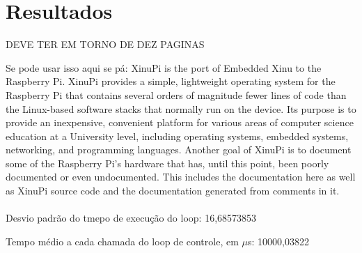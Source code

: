 \section{Resultados}
\label{seq:resultados}

DEVE TER EM TORNO DE DEZ PAGINAS


Se pode usar isso aqui se pá: XinuPi is the port of Embedded Xinu to the Raspberry Pi. XinuPi provides a simple, lightweight operating system for the Raspberry Pi that contains several orders of magnitude fewer lines of code than the Linux-based software stacks that normally run on the device. Its purpose is to provide an inexpensive, convenient platform for various areas of computer science education at a University level, including operating systems, embedded systems, networking, and programming languages. Another goal of XinuPi is to document some of the Raspberry Pi’s hardware that has, until this point, been poorly documented or even undocumented. This includes the documentation here as well as XinuPi source code and the documentation generated from comments in it.
\\\\
Desvio padrão do tmepo de execução do loop: 16,68573853

Tempo médio a cada chamada do loop de controle, em $\mu$s: 10000,03822
